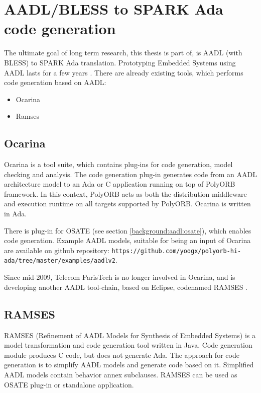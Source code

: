 \section{AADL/BLESS to SPARK Ada code generation}
\label{background:codegen}

The ultimate goal of long term research, this thesis is part of, is AADL (with BLESS) to SPARK Ada translation. Prototyping Embedded Systems using AADL lasts for a few years \cite{PrototypyingAadl:Paper}. There are already existing tools, which performs code generation based on AADL:
\begin{itemize}
	\item Ocarina
	\item Ramses
\end{itemize}



\subsection{Ocarina}
\label{background:codegen:ocarina}

Ocarina \cite{Ocarina:Paper} is a tool suite, which contains plug-ins for code generation, model checking and analysis. The code generation plug-in generates code from an AADL architecture model to an Ada or C application running on top of PolyORB framework. In this context, PolyORB acts as both the distribution middleware and execution runtime on all targets supported by PolyORB. Ocarina is written in Ada.

There is plug-in for OSATE (see section \ref{background:aadl:osate}), which enables code generation. Example AADL models, suitable for being an input of Ocarina are available on github repository: \lstinline{https://github.com/yoogx/polyorb-hi-ada/tree/master/examples/aadlv2}.

Since mid-2009, Telecom ParisTech is no longer involved in Ocarina, and is developing another AADL tool-chain, based on Eclipse, codenamed RAMSES \cite{Ocarina:About:Online}.



\subsection{RAMSES}
\label{background:codegen:ramses}

RAMSES (Refinement of AADL Models for Synthesis of Embedded Systems) is a model transformation and code generation tool written in Java. Code generation module produces C code, but does not generate Ada. The approach for code generation is to simplify AADL models and generate code based on it. Simplified AADL models contain behavior annex subclauses. RAMSES can be used as OSATE plug-in or standalone application.

